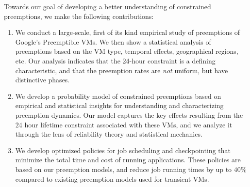 Towards our goal of developing a better understanding of constrained preemptions, we make the following contributions:
\begin{enumerate} %

\item We conduct a large-scale, first of its kind empirical study of preemptions of Google's Preemptible VMs. We then show a statistical analysis of preemptions based on the VM type, temporal effects, geographical regions, etc. Our analysis 
  indicates that the 24-hour constraint is a defining characteristic, and that the preemption rates are \emph{not} uniform, but have distinctive phases. 

\item We develop a probability model of constrained preemptions based on empirical and statistical insights for understanding and characterizing preemption dynamics.  Our model captures the key effects resulting from the 24 hour lifetime constraint associated with these VMs, and we analyze it through the lens of reliability theory and statistical mechanics. 


\item We develop optimized policies for job scheduling and  checkpointing that minimize the total time and cost of running applications. These policies are based on our preemption models, and reduce job running times by up to 40\% compared to existing preemption models used for transient VMs. 
  


\end{enumerate}
